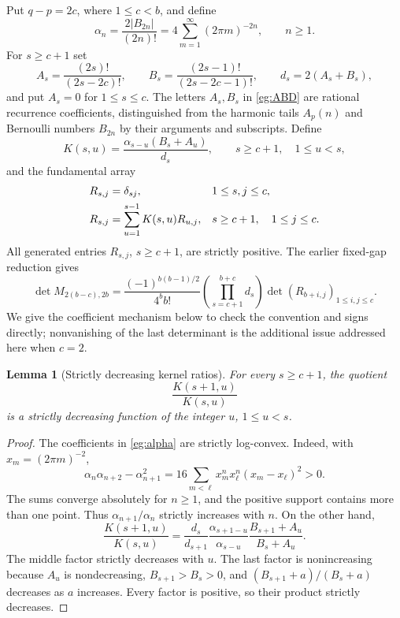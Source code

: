 \documentclass[11pt]{article}
\newtheorem{lemma}[theorem]{Lemma}
\theoremstyle{definition}
\theoremstyle{remark}
\numberwithin{equation}{section}
\begin{document}
Put $q-p=2c$, where $1\le c<b$, and define
\begin{equation}\label{eg:alpha}
 \alpha_n=\frac{2|B_{2n}|}{(2n)!}
          =4\sum_{m=1}^{\infty}(2\pi m)^{-2n},\qquad n\ge1.
\end{equation}
For $s\ge c+1$ set
\begin{equation}\label{eg:ABD}
 A_s=\frac{(2s)!}{(2s-2c)!},\qquad
 B_s=\frac{(2s-1)!}{(2s-2c-1)!},\qquad
 d_s=2(A_s+B_s),
\end{equation}
and put $A_s=0$ for $1\le s\le c$. The letters $A_s,B_s$ in
\eqref{eg:ABD} are rational recurrence coefficients, distinguished from
the harmonic tails $A_p(n)$ and Bernoulli numbers $B_{2n}$ by their
arguments and subscripts. Define
\begin{equation}\label{eg:kernel}
 K(s,u)=\frac{\alpha_{s-u}(B_s+A_u)}{d_s},
 \qquad s\ge c+1,\quad1\le u<s,
\end{equation}
and the fundamental array
\begin{align}
 R_{s,j}&=\delta_{sj},&&1\le s,j\le c,\notag\\
 R_{s,j}&=\sum_{u=1}^{s-1}K(s,u)R_{u,j},
       &&s\ge c+1,\quad1\le j\le c.
       \label{eg:fundamental}
\end{align}
All generated entries $R_{s,j}$, $s\ge c+1$, are strictly positive.
The earlier fixed-gap reduction gives
\begin{equation}\label{eg:inherited-reduction}
 \det M_{2(b-c),2b}
 =\frac{(-1)^{b(b-1)/2}}{4^bb!}
    \left(\prod_{s=c+1}^{b+c}d_s\right)
    \det(R_{b+i,j})_{1\le i,j\le c}.
\end{equation}
We give the coefficient mechanism below to check the convention and
signs directly; nonvanishing of the last determinant is the additional
issue addressed here when $c=2$.

\begin{lemma}[Strictly decreasing kernel ratios]\label{eg:kernel-ratios}
For every $s\ge c+1$, the quotient
\[
                   \frac{K(s+1,u)}{K(s,u)}
\]
is a strictly decreasing function of the integer $u$, $1\le u<s$.
\end{lemma}

\begin{proof}
The coefficients in \eqref{eg:alpha} are strictly log-convex. Indeed,
with $x_m=(2\pi m)^{-2}$,
\[
 \alpha_n\alpha_{n+2}-\alpha_{n+1}^2
 =16\sum_{m<\ell}x_m^nx_\ell^n(x_m-x_\ell)^2>0.
\]
The sums converge absolutely for $n\ge1$, and the positive support
contains more than one point. Thus $\alpha_{n+1}/\alpha_n$ strictly
increases with $n$. On the other hand,
\[
 \frac{K(s+1,u)}{K(s,u)}
 =\frac{d_s}{d_{s+1}}
   \frac{\alpha_{s+1-u}}{\alpha_{s-u}}
   \frac{B_{s+1}+A_u}{B_s+A_u}.
\]
The middle factor strictly decreases with $u$. The last factor is
nonincreasing because $A_u$ is nondecreasing, $B_{s+1}>B_s>0$,
and $(B_{s+1}+a)/(B_s+a)$ decreases as $a$ increases. Every factor
is positive, so their product strictly decreases.
\end{proof}
\end{document}
